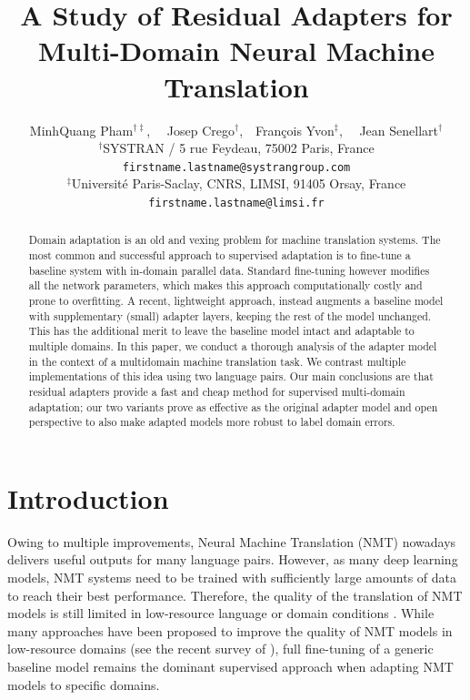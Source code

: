 \documentclass[11pt,a4paper]{article}
\title{A Study of Residual Adapters for Multi-Domain Neural Machine Translation}
\author{MinhQuang Pham$^{\dag\ddag}$, \ \ Josep Crego$^\dag$,\ \ Fran\c cois Yvon$^\ddag$, \ \ Jean Senellart$^\dag$ \\
  $^\dag$SYSTRAN / 5 rue Feydeau, 75002 Paris, France\\
  {\tt firstname.lastname@systrangroup.com}\\
  $^\ddag$Universit\'e Paris-Saclay, CNRS, LIMSI,  91405 Orsay, France\\
  {\tt firstname.lastname@limsi.fr}}
\date{}
\newcommand{\fyDone}[1]{\done[FY]\Todo[FY:]{\textcolor{orange}{#1}}}
\newcommand{\mpTodo}[1]{\Todo[MP:]{\textcolor{green}{#1}}}
\newcommand{\mpDone}[1]{\done[MP]\Todo[MP:]{\textcolor{green}{#1}}}
\begin{document}
\maketitle
\begin{abstract}
\fyDone{Citation-free abstract}
Domain adaptation is an old and vexing problem for machine translation systems. The most common and successful approach to supervised adaptation is to fine-tune a baseline system with in-domain parallel data. Standard fine-tuning however modifies all the network parameters, which makes this approach computationally costly and prone to overfitting. A recent, lightweight approach, instead augments a baseline model with supplementary (small) adapter layers, keeping the rest of the model unchanged. This has the additional merit to leave the baseline model intact and adaptable to multiple domains. In this paper, we conduct a thorough analysis of the adapter model in the context of a multidomain machine translation task. We contrast multiple implementations of this idea using two language pairs. Our main conclusions are that residual adapters provide a fast and cheap method for supervised multi-domain adaptation; our two variants prove as effective as the original adapter model and open perspective to also make adapted models more robust to label domain errors.
\fyDone{abstract to be continued}

\end{abstract}
\section{Introduction \label{sec:intro}}
\mpDone{write introduction} \fyDone{Citations in chronological order}\fyDone{Split long sentences}
Owing to multiple improvements, Neural Machine Translation (NMT) \cite{Kalchbrenner13recurrent,Sutskever14sequence,Bahdanau15learning,Vaswani17attention} nowadays delivers useful outputs for many language pairs. However, as many deep learning models, NMT systems need to be trained with sufficiently large amounts of data to reach their best performance. Therefore, the quality of the translation of NMT models is still limited in low-resource language or domain conditions \cite{duh13adaptation,zoph16transfer,koehn17six}. While many approaches have been proposed to improve the quality of NMT models in low-resource domains (see the recent survey of \citet{Chu18asurvey}), full fine-tuning \cite{Luong15stanford,neubig18rapid} of a generic baseline model remains the dominant supervised approach when adapting NMT models to specific domains.
\end{document}
